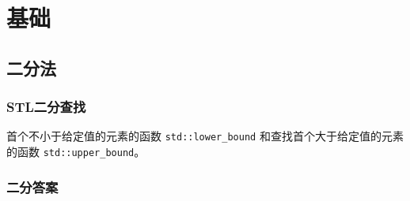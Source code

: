 \chapter{基础}\label{ch:basic}

\section{二分法}\label{sec:binary}

\subsection{STL二分查找}\label{subsec:binary-answer-stl}

首个不小于给定值的元素的函数 \texttt{std::lower\_bound} 和查找首个大于给定值的元素的函数
\texttt{std::upper\_bound}。

\subsection{二分答案}\label{subsec:binary-answer}




